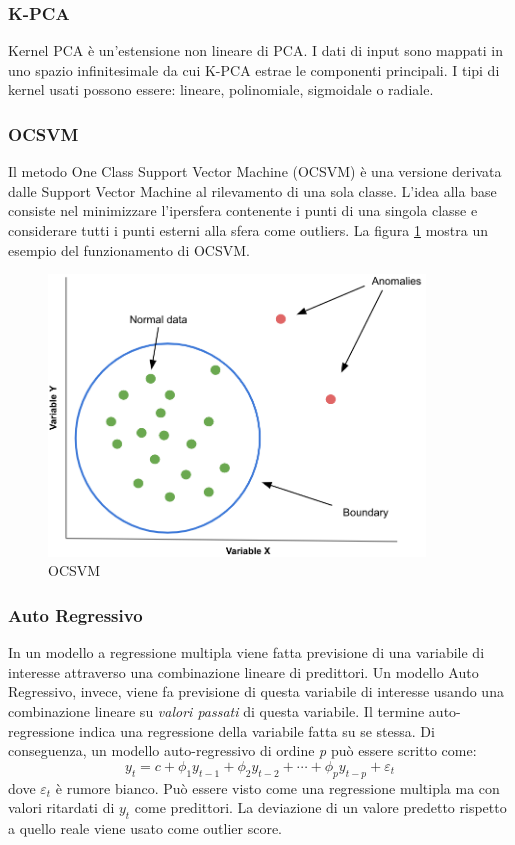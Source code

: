 \subsubsection{K-PCA}
Kernel PCA è un'estensione non lineare di PCA. I dati di input sono mappati in uno spazio infinitesimale da cui K-PCA estrae le componenti principali. I tipi di kernel usati possono essere: lineare, polinomiale, sigmoidale o radiale.

\subsubsection{OCSVM}
Il metodo One Class Support Vector Machine (OCSVM) è una versione derivata dalle Support Vector Machine al rilevamento di una sola classe. L'idea alla base consiste nel minimizzare l'ipersfera contenente i punti di una singola classe e considerare tutti i punti esterni alla sfera come outliers.
La figura \ref{ocsvm} mostra un esempio del funzionamento di OCSVM.
\begin{figure}[t]
	\centering
	\includegraphics[width=10cm, scale=1]{images/ocsvm}
	\caption{OCSVM}
	\label{ocsvm}
\end{figure}


\subsubsection{Auto Regressivo}
In un modello a regressione multipla viene fatta previsione di una variabile di interesse attraverso una combinazione lineare di predittori. Un modello Auto Regressivo, invece, viene fa previsione di questa variabile di interesse usando una combinazione lineare su \textit{valori passati} di questa variabile. Il termine auto-regressione indica una regressione della variabile fatta su se stessa.
Di conseguenza, un modello auto-regressivo di ordine \textit{p} può essere scritto come:
\[y_t=c+\phi_1 y_{t-1}+\phi_2 y_{t-2}+\cdots+\phi_p y_{t-p}+\varepsilon_t\]
dove $\varepsilon_t$ è rumore bianco. Può essere visto come una regressione multipla ma con valori ritardati di $y_t$ come predittori. 
La deviazione di un valore predetto rispetto a quello reale viene usato come outlier score.

